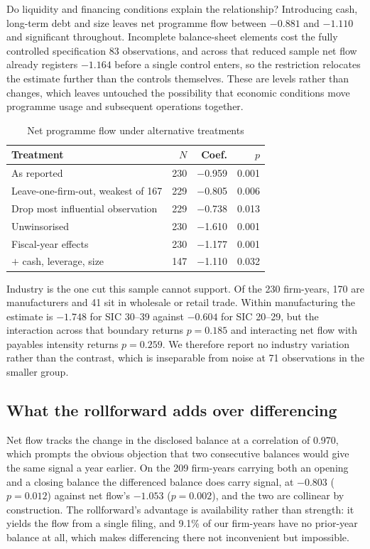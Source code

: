 \documentclass[conference,a4paper]{IEEEtran}
\begin{document}
Do liquidity and financing conditions explain the relationship? Introducing
cash, long-term debt and size leaves net programme flow between $-0.881$ and
$-1.110$ and significant throughout. Incomplete balance-sheet elements cost the
fully controlled specification 83 observations, and across that reduced sample
net flow already registers $-1.164$ before a single control enters, so the
restriction relocates the estimate further than the controls themselves. These
are levels rather than changes, which leaves untouched the possibility that
economic conditions move programme usage and subsequent operations together.

\begin{table}[htbp]
\caption{Net programme flow under alternative treatments}
\label{tab:robust}
\centering
\begin{tabular}{lrrr}
\hline
\textbf{Treatment} & \textbf{$N$} & \textbf{Coef.} & \textbf{$p$}\\
\hline
As reported & 230 & $-$0.959 & 0.001\\
Leave-one-firm-out, weakest of 167 & 229 & $-$0.805 & 0.006\\
Drop most influential observation & 229 & $-$0.738 & 0.013\\
Unwinsorised & 230 & $-$1.610 & 0.001\\
Fiscal-year effects & 230 & $-$1.177 & 0.001\\
$+$ cash, leverage, size & 147 & $-$1.110 & 0.032\\
\hline
\end{tabular}
\end{table}

Industry is the one cut this sample cannot support. Of the 230 firm-years, 170
are manufacturers and 41 sit in wholesale or retail trade. Within manufacturing
the estimate is $-1.748$ for SIC 30--39 against $-0.604$ for SIC 20--29, but the
interaction across that boundary returns $p = 0.185$ and interacting net flow
with payables intensity returns $p = 0.259$. We therefore report no industry
variation rather than the contrast, which is inseparable from noise at 71
observations in the smaller group.

\subsection{What the rollforward adds over differencing}

Net flow tracks the change in the disclosed balance at a correlation of 0.970,
which prompts the obvious objection that two consecutive balances would give the
same signal a year earlier. On the 209 firm-years carrying both an opening and a
closing balance the differenced balance does carry signal, at $-0.803$
($p = 0.012$) against net flow's $-1.053$ ($p = 0.002$), and the two are
collinear by construction. The rollforward's advantage is availability rather
than strength: it yields the flow from a single filing, and 9.1\% of our
firm-years have no prior-year balance at all, which makes differencing there not
inconvenient but impossible.
\end{document}
